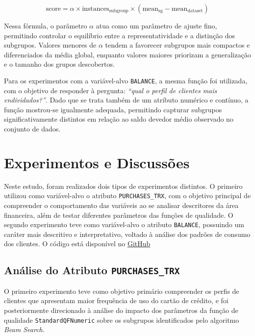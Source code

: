 \documentclass[12pt]{article}
\begin{document}
\begin{equation}
    \text{score} = \alpha \times \text{instances}_{\text{subgroup}} \times (\text{mean}_{\text{sg}} - \text{mean}_{\text{dataset}})
\end{equation}

Nessa fórmula, o parâmetro $\alpha$ atua como um parâmetro de ajuste fino, permitindo controlar o equilíbrio entre a representatividade e a distinção dos subgrupos. Valores menores de $\alpha$ tendem a favorecer subgrupos mais compactos e diferenciados da média global, enquanto valores maiores priorizam a generalização e o tamanho dos grupos descobertos.

Para os experimentos com a variável-alvo \texttt{BALANCE}, a mesma função foi utilizada, com o objetivo de responder à pergunta: \textit{“qual o perfil de clientes mais endividados?”}. Dado que se trata também de um atributo numérico e contínuo, a função mostrou-se igualmente adequada, permitindo capturar subgrupos significativamente distintos em relação ao saldo devedor médio observado no conjunto de dados.

\section{Experimentos e Discussões}

\hspace{1.2cm}Neste estudo, foram realizados dois tipos de experimentos distintos. O primeiro utilizou como variável-alvo o atributo \texttt{PURCHASES\_TRX}, com o objetivo principal de compreender o comportamento das variáveis ao se analisar descritores da área financeira, além de testar diferentes parâmetros das funções de qualidade. O segundo experimento teve como variável-alvo o atributo \texttt{BALANCE}, possuindo um caráter mais descritivo e interpretativo, voltado à análise dos padrões de consumo dos clientes. O código está disponível no \href{https://github.com/larissantana27/AprendizadoDescritivo}{GitHub}

\subsection{Análise do Atributo \texttt{PURCHASES\_TRX}}

\hspace{1.2cm}O primeiro experimento teve como objetivo primário compreender os perfis de clientes que apresentam maior frequência de uso do cartão de crédito, e foi posteriormente direcionado à análise do impacto dos parâmetros da função de qualidade \texttt{StandardQFNumeric} sobre os subgrupos identificados pelo algoritmo \textit{Beam Search}.
\end{document}
